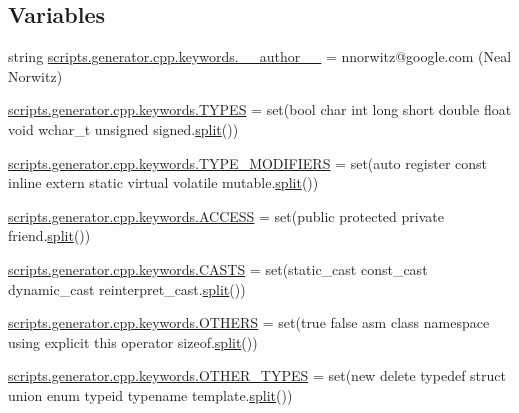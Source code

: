 \subsection*{Variables}
\begin{DoxyCompactItemize}
\item 
string \mbox{\hyperlink{namespacescripts_1_1generator_1_1cpp_1_1keywords_ae480add1f8f173332f7b40600fad3494}{scripts.\+generator.\+cpp.\+keywords.\+\_\+\+\_\+author\+\_\+\+\_\+}} = \textquotesingle{}nnorwitz@google.\+com (Neal Norwitz)\textquotesingle{}
\item 
\mbox{\hyperlink{namespacescripts_1_1generator_1_1cpp_1_1keywords_accb4fe6c0a64f9e93316936fd7f06dda}{scripts.\+generator.\+cpp.\+keywords.\+T\+Y\+P\+ES}} = set(\textquotesingle{}bool char int long short double float void wchar\+\_\+t unsigned signed\textquotesingle{}.\mbox{\hyperlink{_input_8h_aec2fd8cd9140a1b535dc54a924396f40}{split}}())
\item 
\mbox{\hyperlink{namespacescripts_1_1generator_1_1cpp_1_1keywords_a5701189245469d377e3c10975a7dc9cf}{scripts.\+generator.\+cpp.\+keywords.\+T\+Y\+P\+E\+\_\+\+M\+O\+D\+I\+F\+I\+E\+RS}} = set(\textquotesingle{}auto register const inline extern static virtual volatile mutable\textquotesingle{}.\mbox{\hyperlink{_input_8h_aec2fd8cd9140a1b535dc54a924396f40}{split}}())
\item 
\mbox{\hyperlink{namespacescripts_1_1generator_1_1cpp_1_1keywords_a811f6a4463b0622f9beb5409130bce26}{scripts.\+generator.\+cpp.\+keywords.\+A\+C\+C\+E\+SS}} = set(\textquotesingle{}public protected private friend\textquotesingle{}.\mbox{\hyperlink{_input_8h_aec2fd8cd9140a1b535dc54a924396f40}{split}}())
\item 
\mbox{\hyperlink{namespacescripts_1_1generator_1_1cpp_1_1keywords_a4dbcc0ae0c7f141efaab31fd12ab4c04}{scripts.\+generator.\+cpp.\+keywords.\+C\+A\+S\+TS}} = set(\textquotesingle{}static\+\_\+cast const\+\_\+cast dynamic\+\_\+cast reinterpret\+\_\+cast\textquotesingle{}.\mbox{\hyperlink{_input_8h_aec2fd8cd9140a1b535dc54a924396f40}{split}}())
\item 
\mbox{\hyperlink{namespacescripts_1_1generator_1_1cpp_1_1keywords_ac69b37e3a47ecf42d14d9feda7375f13}{scripts.\+generator.\+cpp.\+keywords.\+O\+T\+H\+E\+RS}} = set(\textquotesingle{}true false asm class namespace using explicit this operator sizeof\textquotesingle{}.\mbox{\hyperlink{_input_8h_aec2fd8cd9140a1b535dc54a924396f40}{split}}())
\item 
\mbox{\hyperlink{namespacescripts_1_1generator_1_1cpp_1_1keywords_a77fb6248dd11a440da41672472f77d74}{scripts.\+generator.\+cpp.\+keywords.\+O\+T\+H\+E\+R\+\_\+\+T\+Y\+P\+ES}} = set(\textquotesingle{}new delete typedef struct union enum typeid typename template\textquotesingle{}.\mbox{\hyperlink{_input_8h_aec2fd8cd9140a1b535dc54a924396f40}{split}}())

\end{DoxyCompactItemize}
